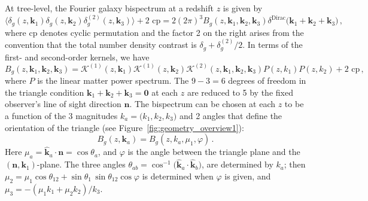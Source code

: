 At tree-level, the Fourier galaxy bispectrum at a redshift $z$ is given by
\begin{equation}
{\big\langle \delta_g(z,\bm{k}_{1})\delta_g(z,\bm{k}_{2})\delta^{(2)}_g(z,\bm{k}_{3}) \big\rangle + \text{2 cp}=2 (2\pi)^3 B_{g}(z, \bm{k}_{1}, \bm{k}_{2}, \bm{k}_{3}) \delta^{\mathrm{Dirac}}\big(\bm{k}_{1}+ \bm{k}_{2}+ \bm{k}_{3} \big)\,,}
\end{equation}
where cp denotes cyclic permutation and the factor 2 on the right arises from the convention that the total number density contrast is $\delta_g+ \delta^{(2)}_g/2$.  
In terms of the first- and second-order kernels, we have
\begin{equation}
B_{g}(z, \bm{k}_{1}, \bm{k}_{2}, \bm{k}_{3}) = \mathcal{K}^{(1)}(z, \bm{k}_{1})\mathcal{K}^{(1)}(z, \bm{k}_{2})\mathcal{K}^{(2)}(z, \bm{k}_{1}, \bm{k}_{2}, \bm{k}_{3})P(z, k_{1})P(z, k_{2}) + \text{2 cp}\,, \label{eq:bkern}
\end{equation}
where $P$ is the linear matter power spectrum. 
The $9-3=6$ degrees of freedom in the triangle condition $\bm{k}_{1}+ \bm{k}_{2}+ \bm{k}_{3}=\bm{0}$ at each $z$ are reduced to 5 by the fixed observer's line of sight direction $\bm{n}$.
The bispectrum can be chosen at each $z$ to be a function  of the 3 magnitudes ${k_a}=\big({k}_{1}, {k}_{2},{k}_{3}\big)$ and 2 angles that define the orientation of the triangle (see Figure~\ref{fig:geometry_overview1}):
\begin{equation}
B_{g}(z, \bm{k}_{a}) =B_{g}(z, {k}_{a},  \mu_1,\varphi) \,.
\end{equation}
Here $\mu_a=\hat{\bm{k}}_a\cdot\bm{n}=\cos\theta_a$,  and $\varphi$ is the angle between the triangle plane and the $(\bm{n},\bm{k}_1)$-plane. The three angles $\theta_{ab}= \cos^{-1}\big(\hat{\bm{k}}_{a} \cdot \hat{\bm{k}}_b\big)$, are determined by $k_a$; then $\mu_2=\mu_1\cos\theta_{12}+ \sin\theta_1\,\sin\theta_{12}\cos\varphi$ is determined when $\varphi$ is given, and $\mu_3=-(\mu_1k_1+\mu_2k_2)/k_3$.

